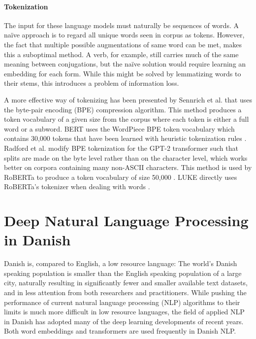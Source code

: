 \documentclass[main.tex]{subfiles}
\begin{document}
\paragraph{Tokenization}
The input for these language models must naturally be sequences of words.
A naïve approach is to regard all unique words seen in corpus as tokens.
However, the fact that multiple possible augmentations of same word can be met, makes this a suboptimal method.
A verb, for example, still carries much of the same meaning between conjugations, but the naïve solution would require learning an embedding for each form.
While this might be solved by lemmatizing words to their stems, this introduces a problem of information loss.

A more effective way of tokenizing has been presented by Sennrich et al. \cite{sennrich-etal-2016-neural} that uses the byte-pair encoding (BPE) compression algorithm.
This method produces a token vocabulary of a given size from the corpus where each token is either a full word or a subword.
BERT uses the WordPiece BPE token vocabulary which contains 30,000 tokens that have been learned with heuristic tokenization rules \cite{wu2016tokenize, devlin2019bert}.
Radford et al. \cite{Radford2019gpt2} modify BPE tokenization for the GPT-2 transformer such that splits are made on the byte level rather than on the character level, which works better on corpora containing many non-ASCII characters.
This method is used by RoBERTa to produce a token vocabulary of size 50,000 \cite{liu2019roberta}.
LUKE directly uses RoBERTa's tokenizer when dealing with words \cite{yamada2020luke}.

\section{Deep Natural Language Processing in Danish}
\label{sec:nlpda}
Danish is, compared to English, a low resource language:
The world's Danish speaking population is smaller than the English speaking population of a large city, naturally resulting in significantly fewer and smaller available text datasets, and in less attention from both researchers and practitioners.
While pushing the performance of current natural language processing (NLP) algorithms to their limits is much more difficult in low resource languages, the field of applied NLP in Danish has adopted many of the deep learning developments of recent years.
Both word embeddings and transformers are used frequently in Danish NLP.
\end{document}
